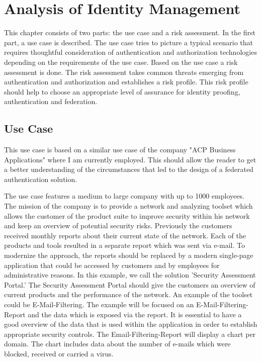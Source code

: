 \chapter{Analysis of Identity Management}\label{chap:analysis}
\chapterstart

This chapter consists of two parts: the use case and a risk assessment. In the first part, a use case is described. The use case tries to picture a typical scenario that requires thoughtful consideration of authentication and authorization technologies depending on the requirements of the use case. Based on the use case a risk assessment is done. The risk assessment takes common threats emerging from authentication and authorization and establishes a risk profile. This risk profile should help to choose an appropriate level of assurance for identity proofing, authentication and federation.

\section{Use Case}
\label{usecase}
This use case is based on a similar use case of the company "ACP Business Applications" where I am currently employed. This should allow the reader to get a better understanding of the circumstances that led to the design of a federated authentication solution. 

The use case features a medium to large company with up to 1000 employees. The mission of the company is to provide a network and analyzing toolset which allows the customer of the product suite to improve security within his network and keep an overview of potential security risks. Previously the customers received monthly reports about their current state of the network. Each of the products and tools resulted in a separate report which was sent via e-mail. To modernize the approach, the reports should be replaced by a modern single-page application that could be accessed by customers and by employees for administrative reasons. In this example, we call the solution 'Security Assessment Portal.' The Security Assessment Portal should give the customers an overview of current products and the performance of the network. An example of the toolset could be E-Mail-Filtering. The example will be focused on an E-Mail-Filtering-Report and the data which is exposed via the report. It is essential to have a good overview of the data that is used within the application in order to establish appropriate security controls. The Email-Filtering-Report will display a chart per domain. The chart includes data about the number of e-mails which were blocked, received or carried a virus. 

